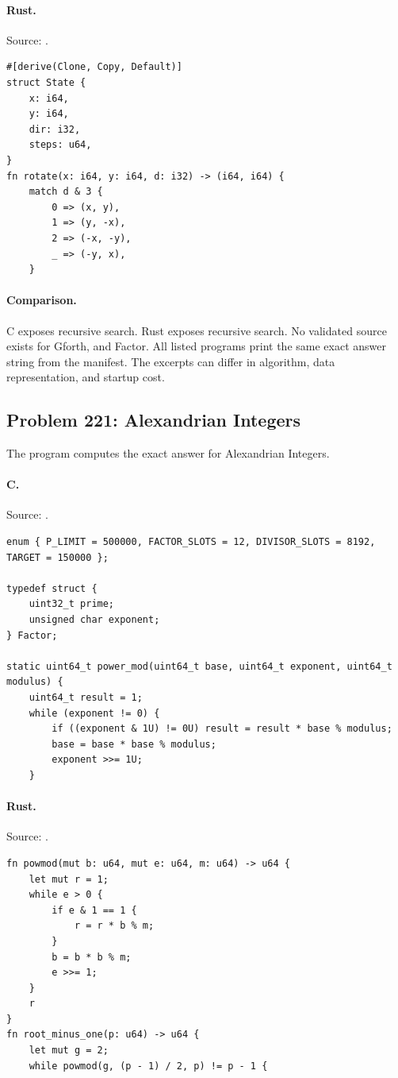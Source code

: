 \paragraph{Rust.} Source: .
\begin{lstlisting}
#[derive(Clone, Copy, Default)]
struct State {
    x: i64,
    y: i64,
    dir: i32,
    steps: u64,
}
fn rotate(x: i64, y: i64, d: i32) -> (i64, i64) {
    match d & 3 {
        0 => (x, y),
        1 => (y, -x),
        2 => (-x, -y),
        _ => (-y, x),
    }
\end{lstlisting}

\paragraph{Comparison.}
C exposes recursive search. Rust exposes recursive search.
No validated source exists for Gforth, and Factor.
All listed programs print the same exact answer string from the manifest. The excerpts can differ in algorithm, data representation, and startup cost.

\subsection{Problem 221: Alexandrian Integers}
\label{walkthrough:p221}
The program computes the exact answer for Alexandrian Integers.

\paragraph{C.} Source: .
\begin{lstlisting}
enum { P_LIMIT = 500000, FACTOR_SLOTS = 12, DIVISOR_SLOTS = 8192, TARGET = 150000 };

typedef struct {
    uint32_t prime;
    unsigned char exponent;
} Factor;

static uint64_t power_mod(uint64_t base, uint64_t exponent, uint64_t modulus) {
    uint64_t result = 1;
    while (exponent != 0) {
        if ((exponent & 1U) != 0U) result = result * base % modulus;
        base = base * base % modulus;
        exponent >>= 1U;
    }
\end{lstlisting}

\paragraph{Rust.} Source: .
\begin{lstlisting}
fn powmod(mut b: u64, mut e: u64, m: u64) -> u64 {
    let mut r = 1;
    while e > 0 {
        if e & 1 == 1 {
            r = r * b % m;
        }
        b = b * b % m;
        e >>= 1;
    }
    r
}
fn root_minus_one(p: u64) -> u64 {
    let mut g = 2;
    while powmod(g, (p - 1) / 2, p) != p - 1 {
\end{lstlisting}

